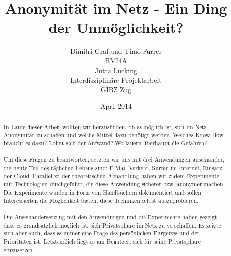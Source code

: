\documentclass[12pt,titlepage]{article}
\begin{document}
\title{Anonymität im Netz - Ein Ding der Unmöglichkeit?}
\author{Dimitri Graf und Timo Furrer\\
  BMI4A\\
  Jutta Lücking\\
  Interdisziplinäre Projektarbeit\\
  GIBZ Zug}
\date{April 2014}
\maketitle

\tableofcontents
\newpage

\begin{abstract}
In Laufe dieser Arbeit wollten wir herausfinden, ob es möglich ist, sich im Netz Anonymität zu schaffen und welche Mittel dazu benötigt werden. Welches Know-How braucht es dazu? Lohnt sich der Aufwand? Wo lauern überhaupt die Gefahren? 
\\
\\
Um diese Fragen zu beantworten, setzten wir uns mit drei Anwendungen auseinander, die heute Teil des täglichen Lebens sind: E-Mail-Verkehr, Surfen im Internet, Einsatz der Cloud. Parallel zu der theoretischen Abhandlung haben wir zudem Experimente mit Technologien durchgeführt, die diese Anwendung sicherer bzw. anonymer machen. Die Experimente wurden in Form von Handbüchern dokumentiert und sollen Interessierten die Möglichkeit bieten, diese Techniken selbst auszuprobieren.
\\
\\
Die Auseinandersetzung mit den Anwendungen und die Experimente haben gezeigt, dass es grundsätzlich möglich ist, sich Privatsphäre im Netz zu verschaffen. Es zeigte sich aber auch, dass es immer eine Frage des persönlichen Ehrgeizes und der Prioritäten ist. Letztendlich liegt es am Benutzer, sich für seine Privatsphäre einzusetzen.  

\end{abstract}



\listoffigures
\end{document}
